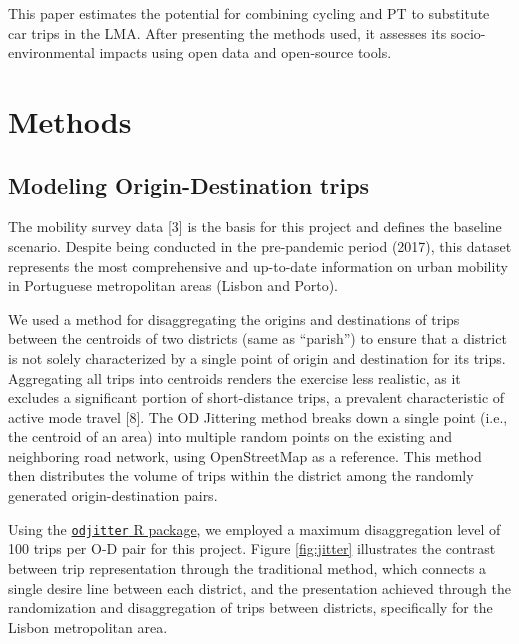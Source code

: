 \documentclass[runningheads]{llncs}
\begin{document}
This paper estimates the potential for combining cycling and PT to
substitute car trips in the LMA. After presenting the methods used, it
assesses its socio-environmental impacts using open data and open-source
tools.

\hypertarget{methods}{%
\section{Methods}\label{methods}}

\hypertarget{modeling-origin-destination-trips}{%
\subsection{Modeling Origin-Destination
trips}\label{modeling-origin-destination-trips}}

The mobility survey data {[}3{]} is the basis for this project and
defines the baseline scenario. Despite being conducted in the
pre-pandemic period (2017), this dataset represents the most
comprehensive and up-to-date information on urban mobility in Portuguese
metropolitan areas (Lisbon and Porto).

We used a method for disaggregating the origins and destinations of
trips between the centroids of two districts (same as ``parish'') to
ensure that a district is not solely characterized by a single point of
origin and destination for its trips. Aggregating all trips into
centroids renders the exercise less realistic, as it excludes a
significant portion of short-distance trips, a prevalent characteristic
of active mode travel {[}8{]}. The OD Jittering method breaks down a
single point (i.e., the centroid of an area) into multiple random points
on the existing and neighboring road network, using OpenStreetMap as a
reference. This method then distributes the volume of trips within the
district among the randomly generated origin-destination pairs.

Using the
\href{https://github.com/dabreegster/odjitter}{\texttt{odjitter} R
package}, we employed a maximum disaggregation level of 100 trips per
O-D pair for this project. Figure \ref{fig:jitter} illustrates the
contrast between trip representation through the traditional method,
which connects a single desire line between each district, and the
presentation achieved through the randomization and disaggregation of
trips between districts, specifically for the Lisbon metropolitan area.
\end{document}
